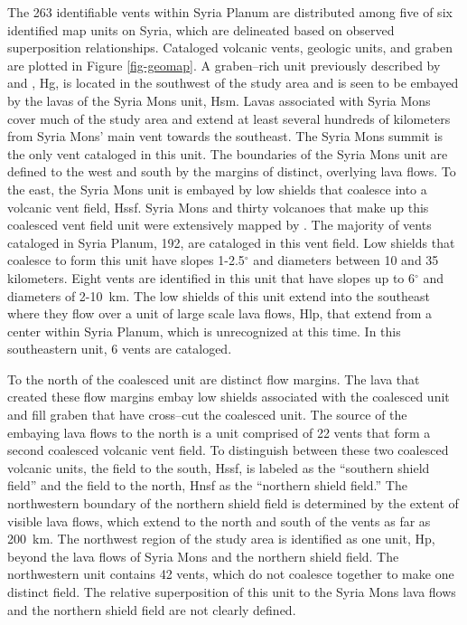 \documentclass[preprint,review,authoryear,12pt]{elsarticle}
\begin{document}
The 263 identifiable vents within Syria Planum are distributed among five of six identified map units on Syria, which are delineated based on observed superposition relationships. Cataloged volcanic vents, geologic units, and graben are plotted in Figure \ref{fig-geomap}. A graben--rich unit previously described by \citet{Baptista2008} and \citet{Tanaka1988}, Hg, is located in the southwest of the study area and is seen to be embayed by the lavas of the Syria Mons unit, Hsm. Lavas associated with Syria Mons cover much of the study area and extend at least several hundreds of kilometers from Syria Mons' main vent towards the southeast. The Syria Mons summit is the only vent cataloged in this unit. The boundaries of the Syria Mons unit are defined to the west and south by the margins of distinct, overlying lava flows. To the east, the Syria Mons unit is embayed by low shields that coalesce into a volcanic vent field, Hssf. Syria Mons and thirty volcanoes that make up this coalesced vent field unit were extensively mapped by \citet{Baptista2008}. The majority of vents cataloged in Syria Planum, 192, are cataloged in this vent field. Low shields that coalesce to form this unit have slopes 1-2.5$^{\circ}$ and diameters between 10 and 35 kilometers. Eight vents are identified in this unit that have slopes up to 6$^{\circ}$ and diameters of 2-10~km. The low shields of this unit extend into the southeast where they flow over a unit of large scale lava flows, Hlp, that extend from a center within Syria Planum, which is unrecognized at this time. In this southeastern unit, 6 vents are cataloged.

To the north of the coalesced unit are distinct flow margins. The lava that created these flow margins embay low shields associated with the coalesced unit and fill graben that have cross--cut the coalesced unit. The source of the embaying lava flows to the north is a unit comprised of 22 vents that form a second coalesced volcanic vent field. To distinguish between these two coalesced volcanic units, the field to the south, Hssf, is labeled as the ``southern shield field'' and the field to the north, Hnsf as the ``northern shield field.'' The northwestern boundary of the northern shield field is determined by the extent of visible lava flows, which extend to the north and south of the vents as far as 200~km. The northwest region of the study area is identified as one unit, Hp, beyond the lava flows of Syria Mons and the northern shield field. The northwestern unit contains 42 vents, which do not coalesce together to make one distinct field. The relative superposition of this unit to the Syria Mons lava flows and the northern shield field are not clearly defined.
\end{document}
